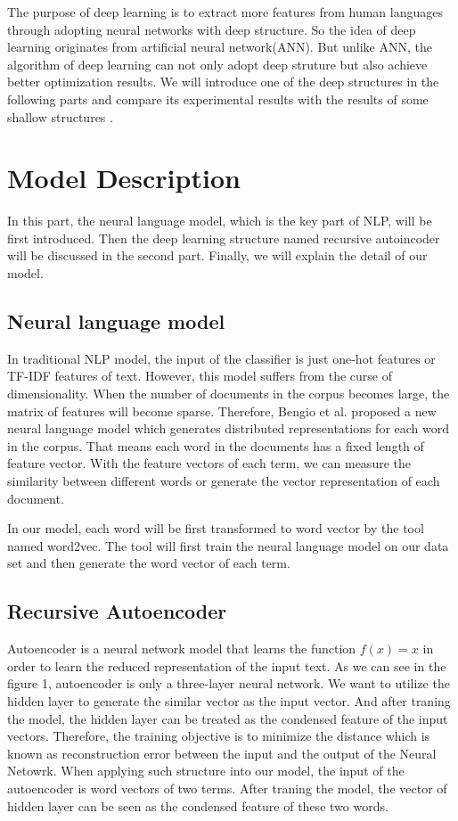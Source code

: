 \documentclass[dvips,9pt]{article}
\begin{document}
The purpose of deep learning is to extract more features from human languages through adopting neural networks with deep structure. So the idea of deep learning originates from artificial neural network(ANN). But unlike ANN, the algorithm of deep learning can not only adopt deep struture but also achieve better optimization results. We will introduce one of the deep structures in the following parts and compare its experimental results with the results of some shallow structures	.
	\section{Model Description}
In this part, the neural language model, which is the key part of NLP, will be first introduced. Then the deep learning structure named recursive  autoincoder will be discussed in the second part. Finally, we will explain the detail of our model.
\subsection{Neural language model}
In traditional NLP model, the input of the classifier is just one-hot features or TF-IDF features of text. However, this model suffers from the curse of dimensionality. When the number of documents in the corpus becomes large, the matrix of features will become sparse. Therefore, Bengio et al.\cite{Bengio2003NLP} proposed a new neural language model which generates distributed representations for each word in the corpus. That means each word in the documents has a fixed length of feature vector. With the feature vectors of each term, we can measure the similarity between different words or generate the vector representation of each document.

In our model, each word will be first transformed to word vector by the tool named word2vec\cite{mikolov2013efficient}. The tool will first train the neural language model on our data set and then generate the word vector of each term.

\subsection{Recursive Autoencoder}
Autoencoder is a neural network model that learns the function $f(x)=x$ in order to learn the reduced representation of the input text. As we can see in the figure 1, autoencoder is only a three-layer neural network. We want to utilize the hidden layer to generate the similar vector as the input vector. And after traning the model, the hidden layer can be treated as the condensed feature of the input vectors. Therefore, the training objective is to minimize the distance which is known as reconstruction error between the input and the output of the Neural Netowrk. When applying such structure into our model, the input of the autoencoder is word vectors of two terms. After traning the model, the vector of hidden layer can be seen as the condensed feature of these two words.
\end{document}
